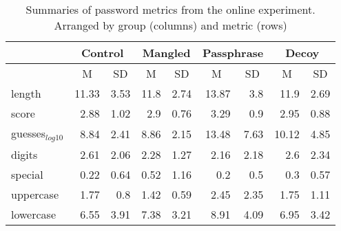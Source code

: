 \begin{table}
  \centering
  \caption{\label{tbl:decoy:zxcvbn-m-sd}Summaries of password metrics from the online experiment. Arranged by group (columns) and metric (rows)}
    \begin{tabular}{p{2cm}rr|rr|rr|rr}
    \toprule
          & \multicolumn{2}{c}{\textbf{Control}} & \multicolumn{2}{c}{\textbf{Mangled}} & \multicolumn{2}{c}{\textbf{Passphrase}} & \multicolumn{2}{c}{\textbf{Decoy}} \\
    \midrule
          & \multicolumn{1}{c}{M} & \multicolumn{1}{c}{SD} & \multicolumn{1}{c}{M} & \multicolumn{1}{c}{SD} & \multicolumn{1}{c}{M} & \multicolumn{1}{c}{SD} & \multicolumn{1}{c}{M} & \multicolumn{1}{c}{SD} \\
    length & 11.33 & 3.53  & 11.8  & 2.74  & 13.87 & 3.8   & 11.9  & 2.69 \\ 
    score & 2.88  & 1.02  & 2.9   & 0.76  & 3.29  & 0.9   & 2.95  & 0.88 \\
    guesses$_{log10}$ & 8.84  & 2.41  & 8.86  & 2.15  & 13.48 & 7.63  & 10.12 & 4.85 \\
    digits & 2.61  & 2.06  & 2.28  & 1.27  & 2.16  & 2.18  & 2.6   & 2.34 \\
    special & 0.22  & 0.64  & 0.52  & 1.16  & 0.2   & 0.5   & 0.3   & 0.57 \\
    uppercase & 1.77  & 0.8   & 1.42  & 0.59  & 2.45  & 2.35  & 1.75  & 1.11 \\
    lowercase & 6.55  & 3.91  & 7.38  & 3.21  & 8.91  & 4.09  & 6.95  & 3.42 \\
    \bottomrule
    \end{tabular}%
\end{table}%